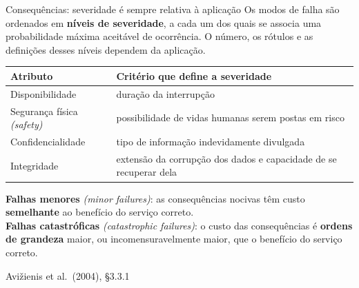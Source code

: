 \documentclass{beamer}
\newcommand{\en}[1]{{\color{depCinza}\textit{#1}}}
\newcommand{\sect}[1]{\par\smallskip\hfill{\tiny\color{black!55}Avi\v{z}ienis et al.\ (2004), #1}}
\begin{document}
\begin{frame}{Consequ\^encias: severidade \'e sempre relativa \`a aplica\c{c}\~ao}
    \footnotesize
    Os modos de falha s\~ao ordenados em \textbf{n\'iveis de severidade}, a cada um dos quais se associa uma probabilidade m\'axima aceit\'avel de ocorr\^encia. O n\'umero, os r\'otulos e as defini\c{c}\~oes desses n\'iveis dependem da aplica\c{c}\~ao.
    \medskip
    \begin{tabularx}{\linewidth}{@{}p{3.0cm} >{\raggedright\arraybackslash}X@{}}
        \toprule
        \textbf{Atributo} & \textbf{Crit\'erio que define a severidade} \\
        \midrule
        Disponibilidade & dura\c{c}\~ao da interrup\c{c}\~ao \\
        Seguran\c{c}a f\'isica \en{(safety)} & possibilidade de vidas humanas serem postas em risco \\
        Confidencialidade & tipo de informa\c{c}\~ao indevidamente divulgada \\
        Integridade & extens\~ao da corrup\c{c}\~ao dos dados e capacidade de se recuperar dela \\
        \bottomrule
    \end{tabularx}
    \medskip
    \begin{defi}
        \scriptsize
        \textbf{Falhas menores} \en{(minor failures)}: as consequ\^encias nocivas t\^em custo \textbf{semelhante} ao benef\'icio do servi\c{c}o correto.\\[3pt]
        \textbf{Falhas catastr\'oficas} \en{(catastrophic failures)}: o custo das consequ\^encias \'e \textbf{ordens de grandeza} maior, ou incomensuravelmente maior, que o benef\'icio do servi\c{c}o correto.
    \end{defi}
    \sect{\S3.3.1}
\end{frame}
\end{document}
